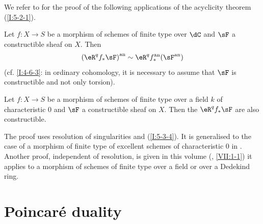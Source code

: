 \subsubsection{}\label{I:5-3-5}

We refer to \cite[XVI.4,5]{sga4} for the proof of the following
applications of the acyclicity theorem (\ref{I:5-2-1}). 





\begin{theorem}\label{I:5-3-6} %
Let $f:X\to S$ be a morphism of schemes of finite type over $\dC$ and $\sF$ a
constructible sheaf on $X$. Then
\[
  \an{(\eR^q f_*\sF)} \sim \eR^q \an f_* (\an\sF)
\]
(cf. \ref{I:4-6-3}: in ordinary cohomology, it is necessary to assume that
$\sF$ is constructible and not only torsion).
\end{theorem}





\begin{theorem}\label{I:5-3-7} %
Let $f:X\to S$ be a morphism of schemes of finite type over a field $k$ of
characteristic $0$ and $\sF$ a constructible sheaf on $X$. Then the
$\eR^q f_* \sF$ are also constructible.
\end{theorem}

The proof uses resolution of singularities and (\ref{I:5-3-4}). It is
generalised to the case of a morphism of finite type of excellent schemes of
characteristic $0$ in \cite[XIX.5]{sga4}. Another proof,
independent of resolution, is given in this volume
(, \ref{VII:1-1})
it applies to a morphism of schemes of finite type over a field or over
a Dedekind ring. 




















\section{Poincar\'e duality}










